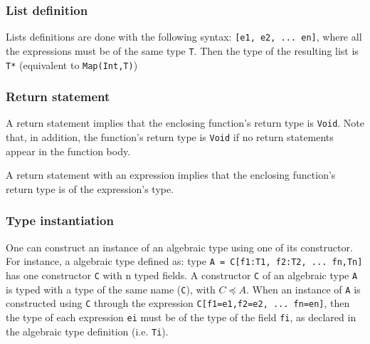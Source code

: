 \documentclass[11pt]{article}
\begin{document}
\subsubsection{List definition}

Lists definitions are done with the following syntax: \texttt{[e1, e2, ... en]}, where all the expressions must be of the same type \texttt{T}. Then the type of the resulting list is \texttt{T*} (equivalent to \texttt{Map(Int,T)})

\begin{center}
\DP
\end{center}

\subsubsection{Return statement}

A return statement implies that the enclosing function's return type is \texttt{Void}. Note that, in addition, the function's return type is \texttt{Void} if no return statements appear in the function body.

\begin{center}
\DP
\end{center}

A return statement with an expression implies that the enclosing function's return type is of the expression's type.

\begin{center}
  
\DP
\end{center}

\subsubsection{Type instantiation}

One can construct an instance of an algebraic type using one of its constructor. For instance, a algebraic type defined as: type \texttt{A = C[f1:T1, f2:T2, ... fn,Tn]} has one constructor \texttt{C} with n typed fields. A constructor \texttt{C} of an algebraic type \texttt{A} is typed with a type of the same name (\texttt{C}), with $C \preceq A$. When an instance of \texttt{A} is constructed using \texttt{C} through the expression \texttt{C[f1=e1,f2=e2, ... fn=en]}, then the type of each expression \texttt{ei} must be of the type of the field \texttt{fi}, as declared in the algebraic type definition (i.e. \texttt{Ti}).
\end{document}
